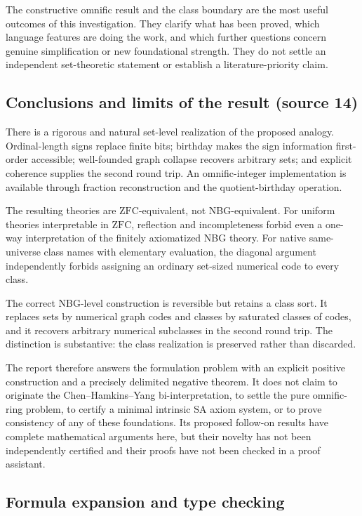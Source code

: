 \documentclass[11pt,letterpaper]{article}
\theoremstyle{definition}
\theoremstyle{remark}
\newcommand{\ZFC}{\mathrm{ZFC}}
\begin{document}
The constructive omnific result and the class boundary are the most useful outcomes
of this investigation. They clarify what has been proved, which language features
are doing the work, and which further questions concern genuine simplification or
new foundational strength. They do not settle an independent set-theoretic statement
or establish a literature-priority claim.

\subsection{Conclusions and limits of the result (source 14)}

There is a rigorous and natural set-level realization of the proposed analogy.
Ordinal-length signs replace finite bits; birthday makes the sign information
first-order accessible; well-founded graph collapse recovers arbitrary sets; and
explicit coherence supplies the second round trip. An omnific-integer implementation
is available through fraction reconstruction and the quotient-birthday operation.

The resulting theories are $\ZFC$-equivalent, not NBG-equivalent. For uniform
theories interpretable in $\ZFC$, reflection and incompleteness forbid even a one-way
interpretation of the finitely axiomatized NBG theory. For native same-universe class
names with elementary evaluation, the diagonal argument independently forbids
assigning an ordinary set-sized numerical code to every class.

The correct NBG-level construction is reversible but retains a class sort. It
replaces sets by numerical graph codes and classes by saturated classes of codes, and
it recovers arbitrary numerical subclasses in the second round trip. The distinction
is substantive: the class realization is preserved rather than discarded.

The report therefore answers the formulation problem with an explicit positive
construction and a precisely delimited negative theorem. It does not claim to
originate the Chen--Hamkins--Yang bi-interpretation, to settle the pure omnific-ring
problem, to certify a minimal intrinsic SA axiom system, or to prove consistency of
any of these foundations. Its proposed follow-on results have complete mathematical
arguments here, but their novelty has not been independently certified and their
proofs have not been checked in a proof assistant.

\subsection{Formula expansion and type checking}
\label{hset:sf:sub:formulas}
\end{document}
